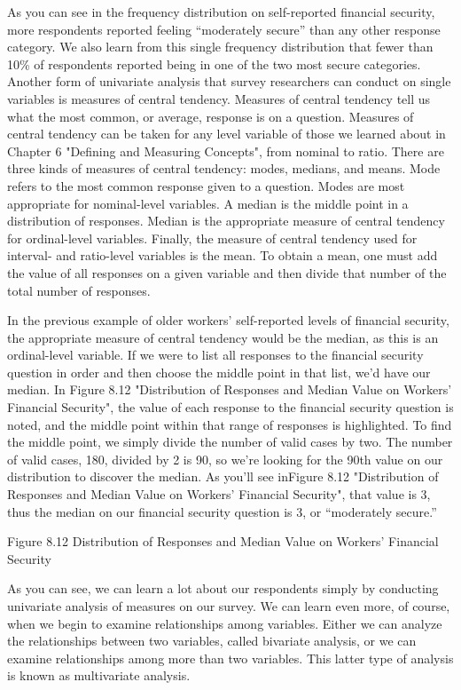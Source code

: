 As you can see in the frequency distribution on self-reported financial security, more respondents reported feeling “moderately secure” than any other response category. We also learn from this single frequency distribution that fewer than 10\% of respondents reported being in one of the two most secure categories. Another form of univariate analysis that survey researchers can conduct on single variables is measures of central tendency. Measures of central tendency tell us what the most common, or average, response is on a question. Measures of central tendency can be taken for any level variable of those we learned about in Chapter 6 "Defining and Measuring Concepts", from nominal to ratio. There are three kinds of measures of central tendency: modes, medians, and means. Mode refers to the most common response given to a question. Modes are most appropriate for nominal-level variables. A median is the middle point in a distribution of responses. Median is the appropriate measure of central tendency for ordinal-level variables. Finally, the measure of central tendency used for interval- and ratio-level variables is the mean. To obtain a mean, one must add the value of all responses on a given variable and then divide that number of the total number of responses.

In the previous example of older workers’ self-reported levels of financial security, the appropriate measure of central tendency would be the median, as this is an ordinal-level variable. If we were to list all responses to the financial security question in order and then choose the middle point in that list, we’d have our median. In Figure 8.12 "Distribution of Responses and Median Value on Workers’ Financial Security", the value of each response to the financial security question is noted, and the middle point within that range of responses is highlighted. To find the middle point, we simply divide the number of valid cases by two. The number of valid cases, 180, divided by 2 is 90, so we’re looking for the 90th value on our distribution to discover the median. As you’ll see inFigure 8.12 "Distribution of Responses and Median Value on Workers’ Financial Security", that value is 3, thus the median on our financial security question is 3, or “moderately secure.”

Figure 8.12 Distribution of Responses and Median Value on Workers’ Financial Security

As you can see, we can learn a lot about our respondents simply by conducting univariate analysis of measures on our survey. We can learn even more, of course, when we begin to examine relationships among variables. Either we can analyze the relationships between two variables, called bivariate analysis, or we can examine relationships among more than two variables. This latter type of analysis is known as multivariate analysis.

